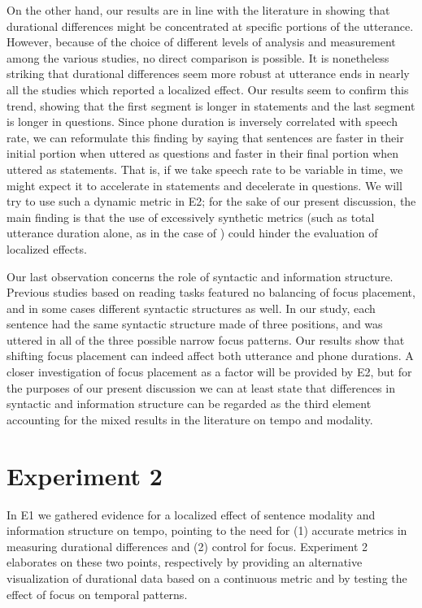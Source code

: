 On the other hand, our results are in line with the literature in showing that durational differences might be concentrated at specific portions of the utterance. However, because of the choice of different levels of analysis and measurement among the various studies, no direct comparison is possible. It is nonetheless striking that durational differences seem more robust at utterance ends in nearly all the studies which reported a localized effect. Our results seem to confirm this trend, showing that the first segment is longer in statements and the last segment is longer in questions. Since phone duration is inversely correlated with speech rate, we can reformulate this finding by saying that sentences are faster in their initial portion when uttered as questions and faster in their final portion when uttered as statements. That is, if we take speech rate to be variable in time, we might expect it to accelerate in statements and decelerate in questions. We will try to use such a dynamic metric in E2; for the sake of our present discussion, the main finding is that the use of excessively synthetic metrics (such as total utterance duration alone, as in the case of \citealt{maturi1988intonazione}) could hinder the evaluation of localized effects.

Our last observation concerns the role of syntactic and information structure. Previous studies based on reading tasks featured no balancing of focus placement, and in some cases different syntactic structures as well. In our study, each sentence had the same syntactic structure made of three positions, and was uttered in all of the three possible narrow focus patterns. Our results show that shifting focus placement can indeed affect both utterance and phone durations. A closer investigation of focus placement as a factor will be provided by E2, but for the purposes of our present discussion we can at least state that differences in syntactic and information structure can be regarded as the third element accounting for the mixed results in the literature on tempo and modality.

\section{Experiment 2}\label{sec44}
In E1 we gathered evidence for a localized effect of sentence modality and information structure on tempo, pointing to the need for (1) accurate metrics in measuring durational differences and (2) control for focus. Experiment 2 elaborates on these two points, respectively by providing an alternative visualization of durational data based on a continuous metric and by testing the effect of focus on temporal patterns.

